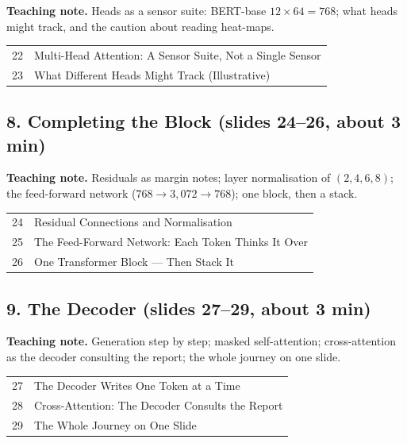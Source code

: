 \documentclass[11pt]{article}
\begin{document}
\textbf{Teaching note.} Heads as a sensor suite: BERT-base $12\times64=768$; what heads might track, and the caution about reading heat-maps.

\begin{center}\small\renewcommand{\arraystretch}{1.1}\begin{tabularx}{\textwidth}{@{}r X@{}}22 & Multi-Head Attention: A Sensor Suite, Not a Single Sensor\\
23 & What Different Heads Might Track (Illustrative)\\\end{tabularx}\end{center}

\subsection{8. Completing the Block \normalfont\small\color{GreyN}(slides 24--26, about 3 min)}

\textbf{Teaching note.} Residuals as margin notes; layer normalisation of $(2,4,6,8)$; the feed-forward network ($768\to3{,}072\to768$); one block, then a stack.

\begin{center}\small\renewcommand{\arraystretch}{1.1}\begin{tabularx}{\textwidth}{@{}r X@{}}24 & Residual Connections and Normalisation\\
25 & The Feed-Forward Network: Each Token Thinks It Over\\
26 & One Transformer Block --- Then Stack It\\\end{tabularx}\end{center}

\subsection{9. The Decoder \normalfont\small\color{GreyN}(slides 27--29, about 3 min)}

\textbf{Teaching note.} Generation step by step; masked self-attention; cross-attention as the decoder consulting the report; the whole journey on one slide.

\begin{center}\small\renewcommand{\arraystretch}{1.1}\begin{tabularx}{\textwidth}{@{}r X@{}}27 & The Decoder Writes One Token at a Time\\
28 & Cross-Attention: The Decoder Consults the Report\\
29 & The Whole Journey on One Slide\\\end{tabularx}\end{center}
\end{document}
